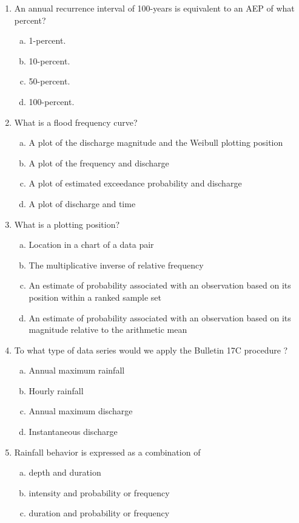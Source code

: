 \documentclass[12pt]{article}
\begin{document}
\begin{enumerate}
\item An annual recurrence interval of 100-years is equivalent to an AEP of what percent?
\begin{enumerate}[a)]
\item 1-percent.
\item 10-percent.
\item 50-percent.
\item 100-percent.
\end{enumerate}
\item What is a flood frequency curve?
\begin{enumerate}[a)]
\item A plot of the discharge magnitude and the Weibull plotting position
\item A plot of the frequency and discharge
\item A plot of estimated exceedance probability and discharge
\item A plot of discharge and time
\end{enumerate}
\item What is a plotting position?
\begin{enumerate}[a)]
\item Location in a chart of a data pair
\item The multiplicative inverse of relative frequency
\item An estimate of probability associated with an observation based on its position within a ranked sample set
\item An estimate of probability associated with an observation based on its magnitude relative to the arithmetic mean
\end{enumerate}
\item To what type of data series would we apply the Bulletin 17C procedure ?
\begin{enumerate}[a)]
\item Annual maximum rainfall
\item Hourly rainfall
\item Annual maximum discharge
\item Instantaneous discharge
\end{enumerate}
\item Rainfall behavior is expressed as a combination of 
\begin{enumerate}[a)]
\item depth and duration
\item intensity and probability or frequency
\item duration and probability or frequency

\end{enumerate}
\end{enumerate}
\end{document}
